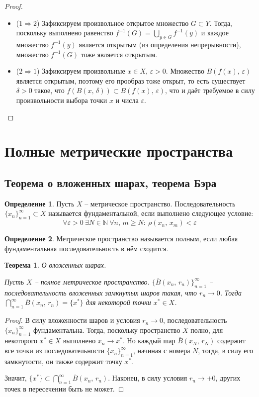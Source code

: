 \documentclass[a4paper,12pt]{article}
\renewcommand{\geq}{\ensuremath{\geqslant}}
\theoremstyle{plain}
\newtheorem{theorem}{Теорема}[section]
\theoremstyle{definition}
\newtheorem{definition}{Определение}[section]
\theoremstyle{remark}
\begin{document}
\begin{proof}
	\begin{itemize}
		\item ($1 \Rightarrow 2$) Зафиксируем произвольное открытое множество $G \subset Y$. Тогда, поскольку выполнено равенство $f^{-1}(G) = \bigcup_{y \in G}f^{-1}(y)$ и каждое множество $f^{-1}(y)$ является открытым (из определения непрерывности), множество $f^{-1}(G)$ тоже является открытым.
		\item ($2 \Rightarrow 1$) Зафиксируем произвольные $x \in X,\, \varepsilon >0$. Множество $B(f(x),\, \varepsilon)$ является открытым, поэтому его прообраз тоже открыт, то есть существует $\delta >0$ такое, что $f(B(x,\, \delta)) \subset B(f(x),\, \varepsilon)$, что и даёт требуемое в силу произвольности выбора точки $x$ и числа $\varepsilon$.
	\end{itemize}
\end{proof}

\section{Полные метрические пространства}
\subsection{Теорема о вложенных шарах, теорема Бэра}
\begin{definition}
	Пусть $X$ -- метрическое пространство. Последовательность $\{x_n\}_{n = 1}^\infty \subset X$ называется фундаментальной, если выполнено следующее условие:
	\[
		\forall \varepsilon > 0 \: \exists N \in \mathbb{N} \: \forall n,\,m \geq N :\: \rho(x_n,\, x_m) < \varepsilon
	\]
\end{definition}

\begin{definition}
	Метрическое пространство называется полным, если любая фундаментальная последовательность в нём сходится.
\end{definition}

\begin{theorem}
	О вложенных шарах.

	Пусть $X$ -- полное метрическое пространство. $\{\overline{B}(x_n,\, r_n)\}_{n = 1}^\infty$ -- последовательность вложенных замкнутых шаров такая, что $r_n \to 0$. Тогда $\bigcap_{n = 1}^\infty \overline{B}(x_n,\, r_n) = \{x^*\}$ для некоторой точки $x^* \in X$.
\end{theorem}

\begin{proof}
	В силу вложенности шаров и условия $r_n \to 0$, последовательность $\{x_n\}_{n=1}^\infty$ фундаментальна. Тогда, поскольку пространство $X$ полно, для некоторого $x^* \in X$ выполнено $x_n \to x^*$. Но каждый шар $\overline{B}(x_N,\, r_N)$ содержит все точки из последовательности $\{x_n\}_{n = 1}^\infty$, начиная с номера $N$, тогда, в силу его замкнутости, он также содержит точку $x^*$.

	Значит, $\{x^*\} \subset \bigcap_{n = 1}^\infty \overline{B}(x_n,\, r_n)$. Наконец, в силу условия $r_n \to +0$, других точек в пересечении быть не может.
\end{proof}
\end{document}
